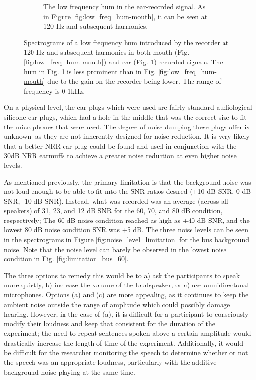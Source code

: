 \begin{figure}[h!]
\begin{subfigure}{0.475\textwidth}
  \caption{The low frequency hum in the ear-recorded signal. As in Figure \ref{fig:low_freq_hum-mouth}, it can be seen at 120 Hz and subsequent harmonics.}
  \label{fig:low_freq_hum-ear}
\end{subfigure}
\caption{Spectrograms of a low frequency hum introduced by the recorder at 120 Hz and subsequent harmonics in both mouth (Fig. \ref{fig:low_freq_hum-mouth}) and ear (Fig. \ref{fig:low_freq_hum-ear}) recorded signals. The hum in Fig. \ref{fig:low_freq_hum-ear} is less prominent than in Fig. \ref{fig:low_freq_hum-mouth} due to the gain on the recorder being lower.  The range of frequency is 0-1kHz.}
\label{fig:low_freq_hum}
\end{figure}

On a physical level, the ear-plugs which were used are fairly standard audiological silicone ear-plugs, which had a hole in the middle that was the correct size to fit the microphones that were used.  The degree of noise damping these plugs offer is unknown, as they are not inherently designed for noise reduction.  It is very likely that a better NRR ear-plug could be found and used in conjunction with the 30dB NRR earmuffs to achieve a greater noise reduction at even higher noise levels.

As mentioned previously, the primary limitation is that the background noise was not loud enough to be able to fit into the SNR ratios desired (+10 dB SNR, 0 dB SNR, -10 dB SNR).  Instead, what was recorded was an average (across all speakers) of 31, 23, and 12 dB SNR for the 60, 70, and 80 dB condition, respectively; The 60 dB noise condition reached as high as +40 dB SNR, and the lowest 80 dB noise condition SNR was +5 dB. The three noise levels can be seen in the spectrograms in Figure \ref{fig:noise_level_limitation} for the bus background noise.  Note that the noise level can barely be observed in the lowest noise condition in Fig. \ref{fig:limitation_bus_60}.

The three options to remedy this would be to a) ask the participants to speak more quietly, b) increase the volume of the loudspeaker, or c) use omnidirectonal microphones.  Options (a) and (c) are more appealing, as it continues to keep the ambient noise outside the range of amplitude which could possibly damage hearing.  However, in the case of (a), it is difficult for a participant to consciously modify their loudness and keep that consistent for the duration of the experiment; the need to repeat sentences spoken above a certain amplitude would drastically increase the length of time of the experiment.  Additionally, it would be difficult for the researcher monitoring the speech to determine whether or not the speech was an appropriate loudness, particularly with the additive background noise playing at the same time.  

